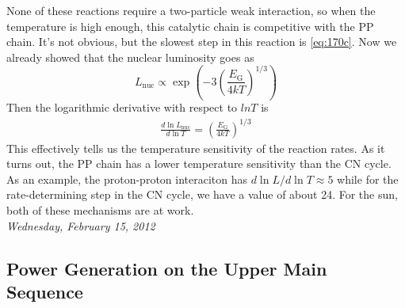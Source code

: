 \documentclass[10pt]{article}
\numberwithin{equation}{section}
\newcommand{\n}{\noindent}
\begin{document}
  None of these reactions require a two-particle weak interaction, so
  when the temperature is high enough, this catalytic chain is
  competitive with the PP chain. It's not obvious, but the slowest
  step in this reaction is \eqref{eq:170c}. Now we already showed that
  the nuclear luminosity goes as
  \begin{equation}
    \label{eq:171}
    L_{\mathrm{nuc}}\propto
    \exp\left(-3\left(\frac{E_{\mathrm{G}}}{4kT}\right)^{1/3}\right)
  \end{equation}
  Then the logarithmic derivative with respect to $ln T$ is
  \begin{align}
    \label{eq:172}
    \frac{d\ln L_{\mathrm{nuc}}}{d\ln T}=\left(\frac{E_{\mathrm{G}}}{4kT}
\right)^{1/3}
  \end{align}
  This effectively tells us the temperature sensitivity of the
  reaction rates. As it turns out, the PP chain has a lower
  temperature sensitivity than the CN cycle. As an example, the
  proton-proton interaciton has $d\ln L/d\ln T\approx 5$ while for the
  rate-determining step in the CN cycle, we have a value of about
  24. For the sun, both of these mechanisms are at work.\\

\n \textit{Wednesday, February 15, 2012}

  \subsection{Power Generation on the Upper Main Sequence}
  \label{sec:power-gener-upper}
\end{document}
